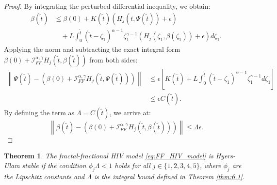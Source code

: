 \documentclass{article}
\theoremstyle{plain}
\newtheorem{theorem}{Theorem}[section]
\theoremstyle{definition}
\numberwithin{equation}{section}
\begin{document}
\begin{proof}
By integrating the perturbed differential inequality, we obtain:
\begin{align*}
    \beta(\tilde{t}) &\leq \beta(0) + K(\tilde{t}) (H_j(t, \Psi(\tilde{t})) + \epsilon) \\
    &\quad + L \int_0^{\tilde{t}} (\tilde{t}-\zeta_1)^{\alpha-1} \zeta_1^{\gamma-1} (H_j(\zeta_1, \beta(\zeta_1)) + \epsilon) d\zeta_1.
\end{align*}
Applying the norm and subtracting the exact integral form $\beta(0) + \mathcal{I}_{FF}^{\alpha, \gamma} H_j(\tilde{t}, \beta(\tilde{t}))$ from both sides:
\begin{align*}
    \left\| \Psi(\tilde{t}) - \left( \beta(0) + \mathcal{I}_{FF}^{\alpha, \gamma} H_j(\tilde{t}, \Psi(\tilde{t})) \right) \right\| &\leq \epsilon \left[ K(\tilde{t}) + L \int_0^{\tilde{t}} (\tilde{t}-\zeta_1)^{\alpha-1} \zeta_1^{\gamma-1} d\zeta_1 \right] \\
    &\leq \epsilon C(\tilde{t}).
\end{align*}
By defining the term as $\Lambda = C(\tilde{t})$, we arrive at:
\begin{equation*}
    \left\| \beta(\tilde{t}) - \left( \beta(0) + \mathcal{I}_{FF}^{\alpha, \gamma} H_j(\tilde{t}, \beta(\tilde{t})) \right) \right\| \leq \Lambda \epsilon.
\end{equation*}
\end{proof}
\begin{theorem}
	The fractal-fractional HIV model \eqref{eq:FF_HIV_model} is Hyers-Ulam stable if the condition $\phi_j \Lambda < 1$ holds for all $j \in \{1, 2, 3, 4, 5\}$, where $\phi_j$ are the Lipschitz constants and $\Lambda$ is the integral bound defined in Theorem \ref{thm:6.1}.
\end{theorem}
\end{document}
